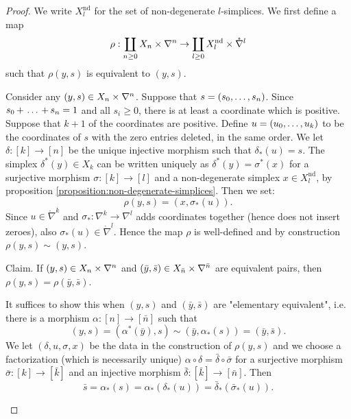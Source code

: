 \begin{proof}
We write $X_l^\text{nd}$ for the set of non-degenerate $l$-simplices. We first define a map
\[\rho:\coprod_{n\ge0} X_n\times\nabla^n\to\coprod_{l\ge0} X_l^\text{nd}\times\mathring\nabla^l\]
such that $\rho(y,s)$ is equivalent to $(y,s)$.

Consider any $(y,s)\in X_n\times\nabla^n$. Suppose that $s=({{s}_0,\dots,{s}_{n}})$. Since ${{s}_0\,{+}\,\dots\,{+}\,{s}_{n}}=1$ and all $s_i\ge0$, there is at least a coordinate which is positive. Suppose that $k+1$ of the coordinates are positive. Define $u=({{u}_0,\dots,{u}_{k}})$ to be the coordinates of $s$ with the zero entries deleted, in the same order. We let $\delta:[k]\to[n]$ be the unique injective morphism such that $\delta_*(u)=s$. The simplex $\delta^*(y)\in X_k$ can be written uniquely as $\delta^*(y)=\sigma^*(x)$ for a surjective morphism $\sigma:[k]\to[l]$ and a non-degenerate simplex $x\in X_l^\text{nd}$, by proposition \ref{proposition:non-degenerate-simplices}. Then we set:
\[\rho(y,s)=(x,\sigma_*(u)).\]
Since $u\in\ring\nabla^{k}$ and $\sigma_*:\nabla^{k}\to\nabla^{l}$ adds coordinates together (hence does not insert zeroes), also $\sigma_*(u)\in\ring\nabla^l$. Hence the map $\rho$ is well-defined and by construction $\rho(y,s)\sim(y,s)$.

Claim. If $(y,s)\in X_n\times\nabla^n$ and $(\bar y,\bar s)\in X_{\bar n}\times\nabla^{\bar n}$ are equivalent pairs, then $\rho(y,s)=\rho(\bar y,\bar s)$.

\begin{claimproof}
It suffices to show this when $(y,s)$ and $(\bar y,\bar s)$ are "elementary equivalent", i.e. there is a morphism $\alpha:[n]\to[\bar n]$ such that
\[(y,s)=(\alpha^*(\bar y),s)\sim(\bar y,\alpha_*(s))=(\bar y,\bar s).\]
We let $(\delta,u,\sigma,x)$ be the data in the construction of $\rho(y,s)$ and we choose a factorization (which is necessarily unique) $\alpha\circ\delta=\bar\delta\circ\bar\sigma$ for a surjective morphism $\bar\sigma:[k]\to[\bar k]$ and an injective morphism $\bar\delta:[\bar k]\to[\bar n]$. Then
\[\bar s=\alpha_*(s)=\alpha_*(\delta_*(u))=\bar\delta_*(\bar\sigma_*(u)).\]


\end{claimproof}
\end{proof}
